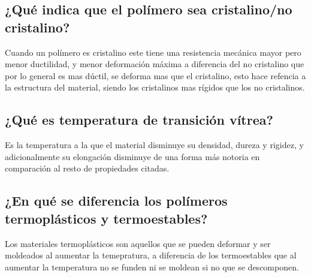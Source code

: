 \documentclass[a4paper, 11pt]{article}
\begin{document}
\subsection{¿Qué indica que el polímero sea cristalino/no cristalino?}
Cuando un polímero es cristalino este tiene una resistencia mecánica mayor pero menor ductilidad, y menor deformación máxima a diferencia del no cristalino que por lo general es mas dúctil, se deforma mas que el cristalino, esto hace refencia a la estructura del material, siendo los cristalinos mas rígidos que los no cristalinos.

\subsection{¿Qué es temperatura de transición vítrea?}
Es la temperatura a la que el material disminuye su densidad, dureza y rigidez, y adicionalmente su elongación disminuye de una forma más notoria en comparación al resto de propiedades citadas.

\subsection{¿En qué se diferencia los polímeros termoplásticos y termoestables?}
Los materiales termoplásticos son aquellos que se pueden deformar y ser moldeados al aumentar la temepratura, a diferencia de los termoestables que al aumentar la temperatura no se funden ni se moldean si no que se descomponen.
\end{document}
